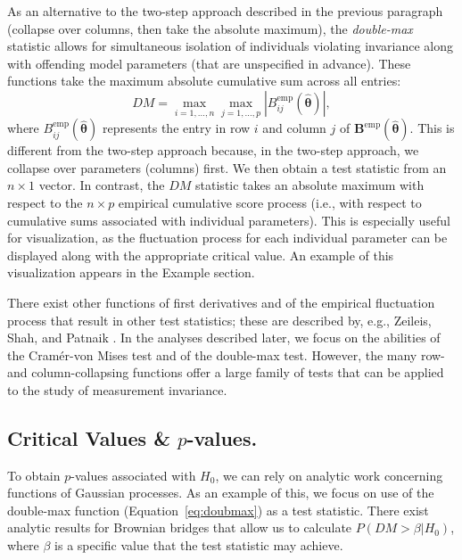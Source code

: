 \documentclass[man]{apa}
\begin{document}
As an alternative to the two-step approach described in the previous
paragraph (collapse over columns, then take the absolute maximum), the
{\em{double-max}} statistic allows for simultaneous isolation of 
individuals violating invariance along with offending model
parameters (that are unspecified in advance).  These functions take
the maximum absolute cumulative sum across all entries:
\begin{equation}
    \label{eq:doubmax}
    DM = \max_{i=1,\ldots,n} \max_{j=1,\ldots,p} |
    B^{\text{emp}}_{ij}(\widehat{\bm{\theta}}) |,
\end{equation}
where $B^{\text{emp}}_{ij}(\widehat{\bm{\theta}})$ represents the
entry in row $i$ and column $j$ of
${\bm{B}}^{\text{emp}}(\widehat{\bm{\theta}})$.  This is different from
the two-step approach because, in the two-step approach, we collapse
over parameters (columns) first.  We then obtain a test statistic
from an $n \times 1$ vector.  In contrast, the
$DM$ statistic takes an absolute maximum with respect to the $n \times
p$ empirical cumulative score process (i.e., with respect to
cumulative sums associated with individual parameters).  This is
especially useful for visualization, as the fluctuation process for
each individual parameter can be displayed along with the appropriate
critical value.  An example of this visualization appears in the
Example section.

There exist other functions of first derivatives and of the
empirical fluctuation process that
result in other test statistics; these are described by, e.g.,
Zeileis, Shah, and Patnaik \citeyear{ZeiSha10}.  
In the analyses described later, we focus on the abilities
of the Cram\'{e}r-von Mises test and of the double-max test.  However,
the many 
row- and column-collapsing functions offer a large family of tests
that can be applied to the study of measurement invariance.

\subsection{Critical Values \& $p$-values.}
To obtain $p$-values associated with $H_0$, we can rely on analytic
work concerning functions of Gaussian processes.
As an example of this, we focus on use of the 
double-max function (Equation~\eqref{eq:doubmax}) as a test statistic.
There exist 
analytic results for Brownian bridges that allow us to calculate
$P(DM > \beta | H_0)$, where $\beta$ is a specific value
that the test statistic may achieve.  
\end{document}

